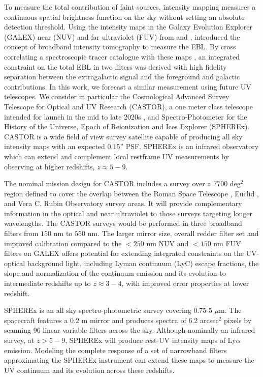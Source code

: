 \documentclass[fleqn,usenatbib]{mnras}
\begin{document}
To measure the total contribution of faint sources, intensity mapping measures a continuous spatial brightness function on the sky without setting an absolute detection threshold. Using the intensity maps in the Galaxy Evolution Explorer ({\small GALEX}) near (NUV) and far ultraviolet (FUV) from \citet{Murthy2010} and \citet{Murthy2018}, \cite{Chiang_2019} introduced the concept of broadband intensity tomography to measure the EBL.  By cross correlating a spectroscopic tracer catalogue with these maps \citep{Newman_2008,mnard2013clusteringbased}, an integrated constraint on the total EBL in two filters was derived with high fidelity separation between the extragalactic signal and the foreground and galactic contributions. In this work, we forecast a similar measurement using future UV telescopes. We consider in particular the Cosmological Advanced Survey Telescope for Optical and UV Research ({\small CASTOR}), a one meter class telescope intended for launch in the mid to late 2020s \citep{Cote2019}, and Spectro-Photometer for the History of the Universe, Epoch of Reionization and Ices Explorer ({\small SPHEREx}).  {\small CASTOR} is a wide field of view survey satellite capable of producing all sky intensity maps with an expected $0.15$'' PSF. {\small SPHEREx} is an infrared observatory which can extend and complement local restframe UV measurements by observing at higher redshifts, $z \approx 5-9$.

The nominal mission design for {\small CASTOR} includes a survey over a $7700$ deg$^2$ \citep{Cote2019} region defined to cover the overlap between the Roman Space Telescope \citep{Dore2018}, Euclid \citep{laureijs2011euclid}, and Vera C. Rubin Observatory \citep{ivezic2019} survey areas. It will provide complementary information in the optical and near ultraviolet to those surveys targeting longer wavelengths. The CASTOR surveys would be performed in three broadband filters from $150$ nm to $550$ nm. The larger mirror size, overall redder filter set and improved calibration compared to the $<250$ nm NUV and $<150$ nm FUV filters on {\small GALEX} offers potential for extending integrated  constraints  on  the  UV-optical background light,  including Lyman continuum (LyC) escape fractions, the slope and normalization of the continuum emission and its evolution to intermediate redshifts up to $z \approx 3-4$, with improved error properties at lower redshift.


{\small SPHEREx} is an all sky spectro-photometric survey covering 0.75-5 $\mu$m. The spacecraft features a 0.2 m mirror and produces spectra of 6.2 arcsec$^2$ pixels by scanning 96 linear variable filters across the sky. Although nominally an infrared survey, at $z>5-9$, {\small SPHEREx} will produce rest-UV intensity maps of Ly$\alpha$ emission. Modeling the complete response of a set of narrowband filters approximating the {\small SPHEREx} instrument can extend these maps to measure the UV continuum and its evolution across these redshifts.
\end{document}
